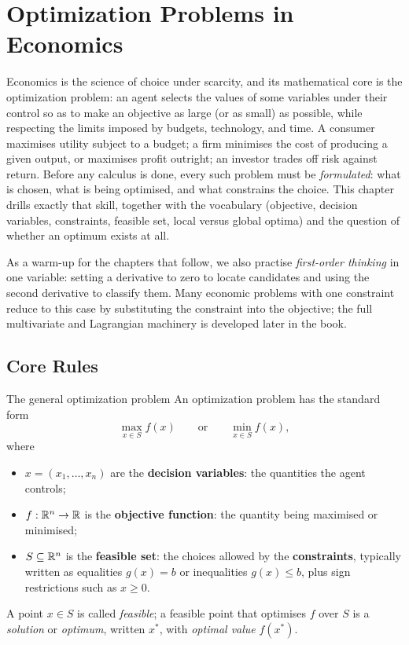 \chapter{Optimization Problems in Economics}

Economics is the science of choice under scarcity, and its mathematical
core is the optimization problem: an agent
selects the values of some variables under their control so as to make an
objective as large (or as small) as possible, while respecting the
limits imposed by budgets, technology, and time. A consumer maximises
utility subject to a budget; a firm minimises the cost of producing a
given output, or maximises profit outright; an investor trades off risk
against return. Before any calculus is done, every such problem must be
\emph{formulated}: what is chosen, what is being optimised, and what
constrains the choice. This chapter drills exactly that skill, together
with the vocabulary (objective, decision variables, constraints,
feasible set, local versus global optima) and the question of whether an
optimum exists at all.

As a warm-up for the chapters that follow, we also practise
\emph{first-order thinking} in one variable: setting a derivative to zero
to locate candidates and using the second derivative to classify them.
Many economic problems with one constraint reduce to this case by
substituting the constraint into the objective; the full multivariate and
Lagrangian machinery is developed later in the book.

\section{Core Rules}

\begin{rulebox}{The general optimization problem}
An optimization problem has the standard form
\[
  \max_{x \in S} f(x)
  \qquad\text{or}\qquad
  \min_{x \in S} f(x),
\]
where
\begin{itemize}[leftmargin=1.6em,itemsep=0.3ex]
  \item $x = (x_1,\dots,x_n)$ are the \textbf{decision variables}: the quantities the agent controls;
  \item $f : \mathbb{R}^n \to \mathbb{R}$ is the \textbf{objective function}: the quantity being maximised or minimised;
  \item $S \subseteq \mathbb{R}^n$ is the \textbf{feasible set}: the choices allowed by the
        \textbf{constraints}, typically written
        as equalities $g(x)=b$ or inequalities $g(x)\le b$, plus sign
        restrictions such as $x \ge 0$.
\end{itemize}
A point $x \in S$ is called \emph{feasible}; a feasible point that
optimises $f$ over $S$ is a \emph{solution} or \emph{optimum}, written
$x^{*}$, with \emph{optimal value} $f(x^{*})$.
\end{rulebox}

